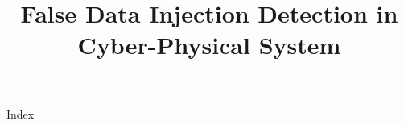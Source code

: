 \documentclass[ieee,english]{slides}
\title{False Data Injection Detection in Cyber-Physical System}
\begin{document}
\maketitle{}

\begin{slide}{Index}
  \begin{minipage}[t][0.6\textheight][t]{0.5\textwidth}
    \tableofcontents[sections={1-3}]
  \end{minipage}
  \begin{minipage}[t][4\baselineskip][t]{0.5\textwidth}
    \tableofcontents[sections={4-}]
  \end{minipage}
  \vfill\null{}
\end{slide}






\end{document}
